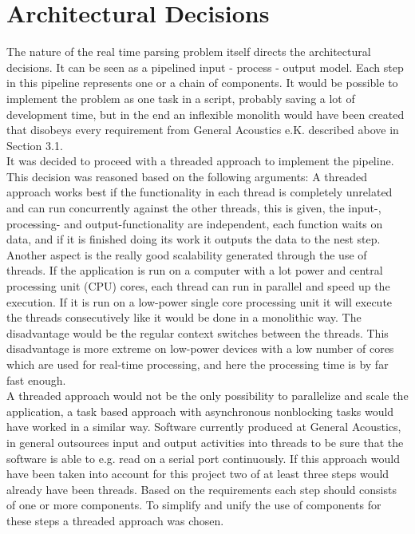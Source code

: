 \section{Architectural Decisions}
The nature of the real time parsing problem itself directs the architectural decisions. It can be seen as a pipelined input - process - output model. Each step in this pipeline represents one or a chain of components. It would be possible to implement the problem as one task in a script, probably saving a lot of development time, but in the end an inflexible monolith would have been created that disobeys every requirement from General Acoustics e.K. described above in Section 3.1.\\ It was decided to proceed with a threaded approach to implement the pipeline. This decision was reasoned based on the following arguments: A threaded approach works best if the functionality in each thread is completely unrelated and can run concurrently against the other threads, this is given, the input-, processing- and output-functionality are independent, each function waits on data, and if it is finished doing its work it outputs the data to the nest step. Another aspect is the really good scalability generated through the use of threads. If the application is run on a computer with a lot power and central processing unit (CPU) cores, each thread can run in parallel and speed up the execution. If it is run on a low-power single core processing unit it will execute the threads consecutively like it would be done in a monolithic way. The disadvantage would be the regular context switches between the threads. This disadvantage is more extreme on low-power devices with a low number of cores which are used for real-time processing, and here the processing time is by far fast enough.\\ A threaded approach would not be the only possibility to parallelize and scale the application, a task based approach with asynchronous nonblocking tasks would have worked in a similar way. Software currently produced at General Acoustics, in general outsources input and output activities into threads to be sure that the software is able to e.g. read on a serial port continuously. If this approach would have been taken into account for this project two of at least three steps would already have been threads. Based on the requirements each step should consists of one or more components. To simplify and unify the use of components for these steps a threaded approach was chosen.\\
